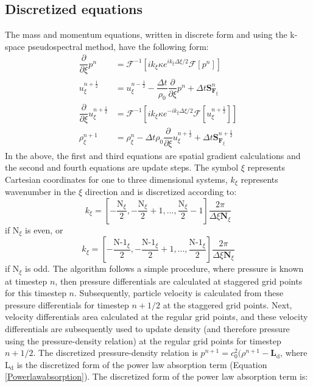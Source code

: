 \documentclass[10pt,a4paper]{article}
\begin{document}
\subsection*{Discretized equations}

The mass and momentum equations, written in discrete form and using the k-space pseudospectral method, have the following form:
\begin{align}
\dfrac{\partial}{\partial \xi} p^n &= \mathcal{F}^{-1} \left[ i k_{\xi} \kappa e^{ i k_{\xi} \Delta \xi /2} \mathcal{F} \left[ p^n \right] \right] \\
u_{\xi}^{n+\frac{1}{2}} &= u_{\xi}^{n-\frac{1}{2}} - \dfrac{\Delta t}{\rho_0} \dfrac{\partial}{\partial \xi} p^n + \Delta t \textbf{S}_{\textbf{F}_{\xi}}^n\\
\dfrac{\partial}{\partial \xi} u_{\xi}^{n+\frac{1}{2}} &= \mathcal{F}^{-1} \left[ i k_{\xi} \kappa e^{-ik_{\xi} \Delta \xi / 2} \mathcal{F} \left[ u_{\xi}^{n+\frac{1}{2}} \right] \right]\\
\rho_{\xi}^{n+1} &= \rho_{\xi}^n - \Delta t \rho_0 \dfrac{\partial}{\partial \xi} u_{\xi}^{n+\frac{1}{2}} + \Delta t  \textbf{S}_{\textbf{F}_{\xi}}^{n+\frac{1}{2}}
\end{align}
In the above, the first and third equations are spatial gradient calculations and the second and fourth equations are update steps. The symbol $\xi$ represents Cartesian coordinates for one to three dimensional systems, $k_{\xi}$ represents wavenumber in the $\xi$ direction and is discretized according to: 
\begin{equation}
k_{\xi} = \left[-\dfrac{\text{N}_{\xi}}{2}, -\dfrac{\text{N}_{\xi}}{2}+1, ... , \dfrac{\text{N}_{\xi}}{2} -1 \right] \dfrac{2\pi}{\Delta \xi \textbf{N}_{\xi}}
\end{equation}
if N$_{\xi}$ is even, or 
\begin{equation}
k_{\xi} = \left[-\dfrac{\text{N-1}_{\xi}}{2}, -\dfrac{\text{N-1}_{\xi}}{2}+1, ... , \dfrac{\text{N-1}_{\xi}}{2} \right] \dfrac{2\pi}{\Delta \xi \textbf{N}_{\xi}}
\end{equation}
if N$_{\xi}$ is odd. The algorithm follows a simple procedure, where pressure is known at timestep $n$, then pressure differentials are calculated at staggered grid points for this timestep $n$. Subsequently, particle velocity is calculated from these pressure differentials for timestep $n+1/2$ at the staggered grid points. Next, velocity differentials area calculated at the regular grid points, and these velocity differentials are subsequently used to update density (and therefore pressure using the pressure-density relation) at the regular grid points for timestep $n+1/2$. The discretized pressure-density relation is $p^{n+1} = c_0^2(\rho^{n+1} - \textbf{L}_{\text{d}}$, where L$_{\text{d}}$ is the discretized form of the power law absorption term (Equation \ref{Powerlawabsorption}). The discretized form of the power law absorption term is:
\end{document}
